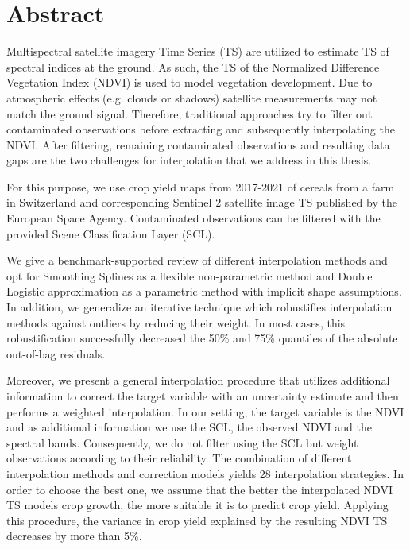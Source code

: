 \chapter*{Abstract}

Multispectral satellite imagery Time Series (TS) are utilized to estimate TS of spectral indices at the ground. As such, the TS of the Normalized Difference Vegetation Index (NDVI) is used to model vegetation development. 
Due to atmospheric effects (e.g. clouds or shadows) satellite measurements may not match the ground signal. Therefore, traditional approaches try to filter out contaminated observations before extracting and subsequently interpolating the NDVI. After filtering, remaining contaminated observations and resulting data gaps are the two challenges for interpolation that we address in this thesis.

For this purpose, we use crop yield maps from 2017-2021 of cereals from a farm in Switzerland and corresponding Sentinel 2 satellite image TS published by the European Space Agency. Contaminated observations can be filtered with the provided Scene Classification Layer (SCL). 

We give a benchmark-supported review of different interpolation methods and opt for Smoothing Splines as a flexible non-parametric method and Double Logistic approximation as a parametric method with implicit shape assumptions. In addition, we generalize an iterative technique which robustifies interpolation methods against outliers by reducing their weight. In most cases, this robustification successfully decreased the 50\% and 75\% quantiles of the absolute out-of-bag residuals. 

Moreover, we present a general interpolation procedure that utilizes additional information to correct the target variable with an uncertainty estimate and then performs a weighted interpolation. In our setting, the target variable is the NDVI and as additional information we use the SCL, the observed NDVI and the spectral bands. Consequently, we do not filter using the SCL but weight observations according to their reliability. The combination of different interpolation methods and correction models yields 28 interpolation strategies. In order to choose the best one, we assume that the better the interpolated NDVI TS models crop growth, the more suitable it is to predict crop yield. 
Applying this procedure, the variance in crop yield explained by the resulting NDVI TS decreases by more than 5\%. 

